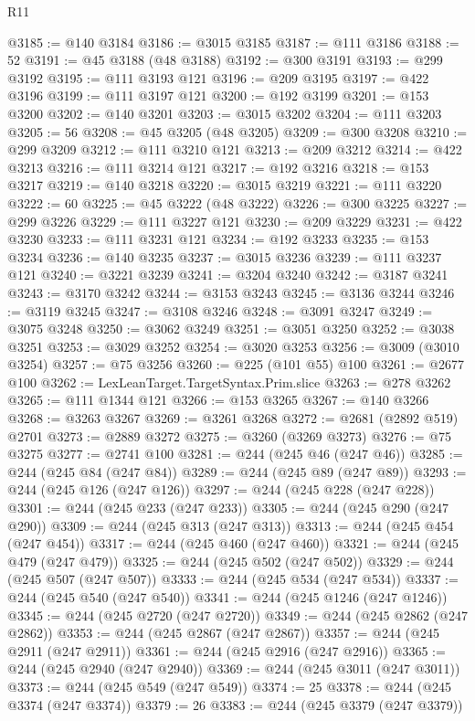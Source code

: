 \begin{lexlean}{R11}
\begin{coremodule}
{{{{{{{{{{{{{{{{{{{{{{{{{{{{{{{{{{{{{{{{{{{{{{{{{{{{{{{{{{{{{{{{{{{{{{{{{{{{{{{{{{@3185 := @140 @3184
@3186 := @3015 @3185
@3187 := @111 @3186
@3188 := 52
@3191 := @45 @3188 (@48 @3188)
@3192 := @300 @3191
@3193 := @299 @3192
@3195 := @111 @3193 @121
@3196 := @209 @3195
@3197 := @422 @3196
@3199 := @111 @3197 @121
@3200 := @192 @3199
@3201 := @153 @3200
@3202 := @140 @3201
@3203 := @3015 @3202
@3204 := @111 @3203
@3205 := 56
@3208 := @45 @3205 (@48 @3205)
@3209 := @300 @3208
@3210 := @299 @3209
@3212 := @111 @3210 @121
@3213 := @209 @3212
@3214 := @422 @3213
@3216 := @111 @3214 @121
@3217 := @192 @3216
@3218 := @153 @3217
@3219 := @140 @3218
@3220 := @3015 @3219
@3221 := @111 @3220
@3222 := 60
@3225 := @45 @3222 (@48 @3222)
@3226 := @300 @3225
@3227 := @299 @3226
@3229 := @111 @3227 @121
@3230 := @209 @3229
@3231 := @422 @3230
@3233 := @111 @3231 @121
@3234 := @192 @3233
@3235 := @153 @3234
@3236 := @140 @3235
@3237 := @3015 @3236
@3239 := @111 @3237 @121
@3240 := @3221 @3239
@3241 := @3204 @3240
@3242 := @3187 @3241
@3243 := @3170 @3242
@3244 := @3153 @3243
@3245 := @3136 @3244
@3246 := @3119 @3245
@3247 := @3108 @3246
@3248 := @3091 @3247
@3249 := @3075 @3248
@3250 := @3062 @3249
@3251 := @3051 @3250
@3252 := @3038 @3251
@3253 := @3029 @3252
@3254 := @3020 @3253
@3256 := @3009 (@3010 @3254)
@3257 := @75 @3256
@3260 := @225 (@101 @55) @100
@3261 := @2677 @100
@3262 := LexLeanTarget.TargetSyntax.Prim.slice
@3263 := @278 @3262
@3265 := @111 @1344 @121
@3266 := @153 @3265
@3267 := @140 @3266
@3268 := @3263 @3267
@3269 := @3261 @3268
@3272 := @2681 (@2892 @519) @2701
@3273 := @2889 @3272
@3275 := @3260 (@3269 @3273)
@3276 := @75 @3275
@3277 := @2741 @100
@3281 := @244 (@245 @46 (@247 @46))
@3285 := @244 (@245 @84 (@247 @84))
@3289 := @244 (@245 @89 (@247 @89))
@3293 := @244 (@245 @126 (@247 @126))
@3297 := @244 (@245 @228 (@247 @228))
@3301 := @244 (@245 @233 (@247 @233))
@3305 := @244 (@245 @290 (@247 @290))
@3309 := @244 (@245 @313 (@247 @313))
@3313 := @244 (@245 @454 (@247 @454))
@3317 := @244 (@245 @460 (@247 @460))
@3321 := @244 (@245 @479 (@247 @479))
@3325 := @244 (@245 @502 (@247 @502))
@3329 := @244 (@245 @507 (@247 @507))
@3333 := @244 (@245 @534 (@247 @534))
@3337 := @244 (@245 @540 (@247 @540))
@3341 := @244 (@245 @1246 (@247 @1246))
@3345 := @244 (@245 @2720 (@247 @2720))
@3349 := @244 (@245 @2862 (@247 @2862))
@3353 := @244 (@245 @2867 (@247 @2867))
@3357 := @244 (@245 @2911 (@247 @2911))
@3361 := @244 (@245 @2916 (@247 @2916))
@3365 := @244 (@245 @2940 (@247 @2940))
@3369 := @244 (@245 @3011 (@247 @3011))
@3373 := @244 (@245 @549 (@247 @549))
@3374 := 25
@3378 := @244 (@245 @3374 (@247 @3374))
@3379 := 26
@3383 := @244 (@245 @3379 (@247 @3379))
}}}}}}}}}}}}}}}}}}}}}}}}}}}}}}}}}}}}}}}}}}}}}}}}}}}}}}}}}}}}}}}}}}}}}}}}}}}}}}}}}}
\end{coremodule}
\end{lexlean}
